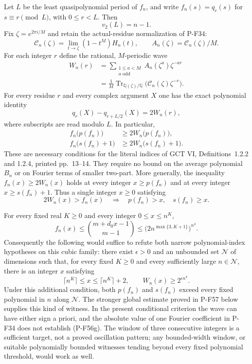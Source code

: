 \begin{proposition}
Let $L$ be the least quasipolynomial period of $f_n$, and write
$f_n(s)=q_r(s)$ for $s\equiv r\pmod L$, with
$0\le r<L$. Then
\[
                     v_2(L)=n-1.                            \tag{P-F56b}
\]
Fix $\zeta=e^{2\pi i/M}$ and retain the actual-residue
normalization of P-F34:
\[
 \mathcal C_n(\zeta)=\lim_{t\to\zeta}(1-t^M)H_n(t),
 \qquad A_n(\zeta)=\mathcal C_n(\zeta)/M.
\]
For each integer $r$ define the rational, $M$-periodic wave
\[
 \begin{split}
 W_n(r)
   &=\sum_{\substack{1\le a<M\\a\text{ odd}}}
                      A_n(\zeta^a)\zeta^{-ar}\\
   &=\frac1M\operatorname{Tr}_{\mathbb Q(\zeta)/\mathbb Q}
                  \bigl(\mathcal C_n(\zeta)\zeta^{-r}\bigr).
 \end{split}                                                 \tag{P-F56c}
\]
For every residue $r$ and every complex argument $X$ one has
the exact polynomial identity
\[
               q_r(X)-q_{r+L/2}(X)=2W_n(r),                 \tag{P-F56d}
\]
where subscripts are read modulo $L$. In particular,
\[
 \begin{split}
 f_n\bigl(p(f_n)\bigr)&\ge2W_n\bigl(p(f_n)\bigr),\\
 f_n\bigl(s(f_n)+1\bigr)&\ge2W_n\bigl(s(f_n)+1\bigr).
 \end{split}                                                 \tag{P-F56e}
\]
These are necessary conditions for the literal indices of
GCT VI, Definitions~1.2.2 and 1.2.4, printed pp.~13--14.
They require no bound on the average polynomial $B_n$ or on
Fourier terms of smaller two-part.
More generally, the inequality $f_n(x)\ge2W_n(x)$ holds
at every integer $x\ge p(f_n)$ and at every integer
$x\ge s(f_n)+1$. Thus a single integer $x\ge0$ satisfying
\[
          2W_n(x)>f_n(x)
       \quad\Longrightarrow\quad p(f_n)>x,
                                  \quad s(f_n)\ge x.
 \tag{P-F56e'}
\]

For every fixed real $K\ge0$ and every integer $0\le x\le n^K$,
\[
 f_n(x)\le\binom{m+d_0x-1}{m-1}
     \le\bigl(2n^{\max\{3,K+1\}}\bigr)^{n^3}.
 \tag{P-F56f}
\]
Consequently the following would suffice to refute both narrow
polynomial-index hypotheses on this cubic family: there exist
$\epsilon>0$ and an unbounded set $\mathcal N$ of dimensions
such that, for every fixed $K\ge0$ and every sufficiently large
$n\in\mathcal N$, there is an integer $x$ satisfying
\[
 \lceil n^K\rceil\le x\le\lceil n^K\rceil+2,
                         \qquad W_n(x)\ge2^{\epsilon n^4}.
 \tag{P-F56g}
\]
Under this additional condition, both $p(f_n)$ and $s(f_n)$
exceed every fixed polynomial in $n$ along $\mathcal N$.
The stronger global estimate proved in P-F57 below supplies
this kind of witness. In the present conditional criterion the wave can have
either sign a priori, and the absolute value of one Fourier
coefficient in P-F34 does not establish (P-F56g).
The window of three consecutive integers is a sufficient
target, not a proved oscillation pattern; any bounded-width
window, or suitable polynomially bounded witnesses tending
beyond every fixed polynomial threshold, would work as well.
\end{proposition}

